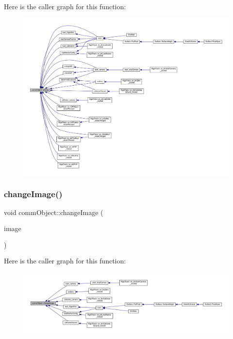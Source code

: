 Here is the caller graph for this function\+:\nopagebreak
\begin{figure}[H]
\begin{center}
\leavevmode
\includegraphics[width=350pt]{classcomm_object_aec354c7099b3039083cc4224e071e022_icgraph}
\end{center}
\end{figure}
\mbox{\label{classcomm_object_a6f81522c2aa1668fa402f08710e6206b}} 
\subsubsection{\texorpdfstring{change\+Image()}{changeImage()}}
{\footnotesize\ttfamily void comm\+Object\+::change\+Image (\begin{DoxyParamCaption}\item[{Q\+Pixmap}]{image }\end{DoxyParamCaption})}

Here is the caller graph for this function\+:\nopagebreak
\begin{figure}[H]
\begin{center}
\leavevmode
\includegraphics[width=350pt]{classcomm_object_a6f81522c2aa1668fa402f08710e6206b_icgraph}
\end{center}
\end{figure}
\mbox{\label{classcomm_object_a1f4b8dd22ecc46bab619f6b1fe1a5144}} 
